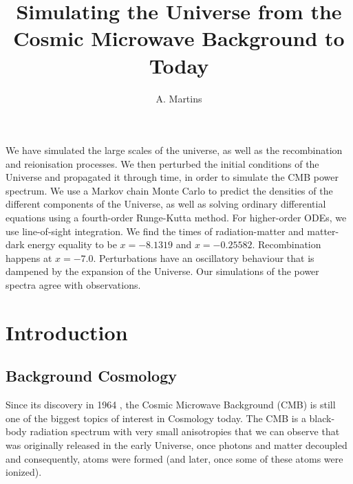 \documentclass{aa}
\begin{document}
 


   \title{Simulating the Universe from the Cosmic Microwave Background to Today}

   \subtitle{}

   \author{A. Martins
          }


   \date{}

 
  \abstract
   {}
   {We have simulated the large scales of the universe, as well as the recombination and reionisation processes. We then perturbed the initial conditions of the Universe and propagated it through time, in order to simulate the CMB power spectrum.}
   {We use a Markov chain Monte Carlo to predict the densities of the different components of the Universe, as well as solving ordinary differential equations using a fourth-order Runge-Kutta method. For higher-order ODEs, we use line-of-sight integration.}
   {We find the times of radiation-matter and matter-dark energy equality to be $x=-8.1319$ and $x=-0.25582$. Recombination happens at $x=-7.0$. Perturbations have an oscillatory behaviour that is dampened by the expansion of the Universe. Our simulations of the power spectra agree with observations.}
   {}


   \maketitle
%

\section{Introduction}

\subsection{Background Cosmology}
Since its discovery in 1964 \citep{1965ApJ...142..419P, 1965ApJ...142..414D}, the Cosmic Microwave Background (CMB) is still one of the biggest topics of interest in Cosmology today. The CMB is a black-body radiation spectrum with very small anisotropies that we can observe that was originally released in the early Universe, once photons and matter decoupled and consequently, atoms were formed (and later, once some of these atoms were ionized).
\end{document}
